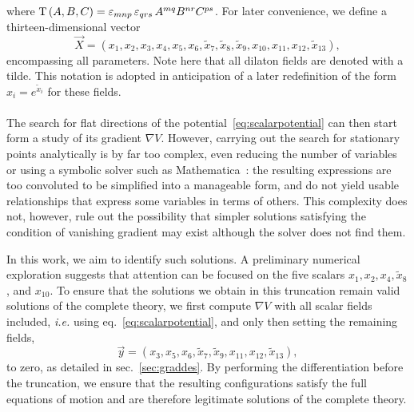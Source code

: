 \documentclass[11pt,a4paper]{article}
\begin{document}
where ${\rm T}\left(A,B,C\right)=\varepsilon_{mnp}\,\varepsilon_{qrs}\,A^{mq}B^{nr}C^{ps}$.
For later convenience, we define a thirteen-dimensional vector
\begin{equation} \label{eq:defvecX}
	\vec{X} = (x_1, x_{2}, x_{3}, x_{4}, x_{5}, x_6, \tilde{x}_7, \tilde{x}_8, \tilde{x}_9,x_{10}, x_{11}, x_{12}, \tilde{x}_{13}),
\end{equation}
encompassing all parameters. Note here that all dilaton fields are denoted with a tilde. This notation is adopted in anticipation of a later redefinition of the form \( x_i = e^{\tilde{x}_i} \) for these fields. %

\paragraph{}
The search for flat directions of the potential~\eqref{eq:scalarpotential} can then start form a study of its gradient $\nabla V$. However, carrying out the search for stationary points analytically is by far too complex, even reducing the number of variables or using a symbolic solver such as Mathematica~\cite{Mathematica}: the resulting expressions are too convoluted to be simplified into a manageable form, and do not yield usable relationships that express some variables in terms of others. This complexity does not, however, rule out the possibility that simpler solutions satisfying the condition of vanishing gradient may exist although the solver does not find them. 

In this work, we aim to identify such solutions. 
A preliminary numerical exploration suggests that attention can be focused on the five scalars $x_{1}, x_{2}, x_{4}, \tilde{x}_{8}$, and $x_{10}$. 
To ensure that the solutions we obtain in this truncation remain valid solutions of the complete theory, we first compute $\nabla V$ with all scalar fields included, \textit{i.e.} using eq.~\eqref{eq:scalarpotential}, and only then setting the remaining fields,
\begin{equation} \label{eq:defvecy}
	\vec{y} = (x_3,x_5,x_6,\tilde{x}_7,\tilde{x}_9,x_{11},x_{12},\tilde{x}_{13}),
\end{equation}
to zero, as detailed in sec.~\ref{sec:graddes}. By performing the differentiation before the truncation, we ensure that the resulting configurations satisfy the full equations of motion and are therefore legitimate solutions of the complete theory.
\end{document}
